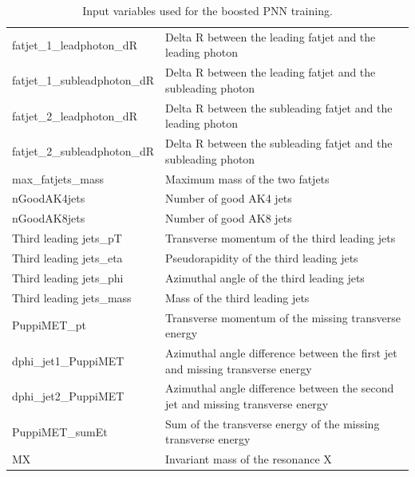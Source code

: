 \begin{table}[htbp!]
\begin{tabularx}{\textwidth}{|l|X|}
    fatjet\_1\_leadphoton\_dR & Delta R between the leading fatjet and the leading photon \\
    fatjet\_1\_subleadphoton\_dR & Delta R between the leading fatjet and the subleading photon \\
    fatjet\_2\_leadphoton\_dR & Delta R between the subleading fatjet and the leading photon \\
    fatjet\_2\_subleadphoton\_dR & Delta R between the subleading fatjet and the subleading photon \\
    max\_fatjets\_mass & Maximum mass of the two fatjets \\
    nGoodAK4jets & Number of good AK4 jets \\
    nGoodAK8jets & Number of good AK8 jets \\
    Third leading jets\_pT & Transverse momentum of the third leading jets \\
    Third leading jets\_eta & Pseudorapidity of the third leading jets \\
    Third leading jets\_phi & Azimuthal angle of the third leading jets \\
    Third leading jets\_mass & Mass of the third leading jets \\
    PuppiMET\_pt & Transverse momentum of the missing transverse energy \\
    dphi\_jet1\_PuppiMET & Azimuthal angle difference between the first jet and missing transverse energy \\
    dphi\_jet2\_PuppiMET & Azimuthal angle difference between the second jet and missing transverse energy \\
    PuppiMET\_sumEt & Sum of the transverse energy of the missing transverse energy \\
    MX & Invariant mass of the resonance X \\
    \hline
    \end{tabularx}
    \caption{Input variables used for the boosted PNN training.}
    \label{tab:inputvariables_boosted}
\end{table}
